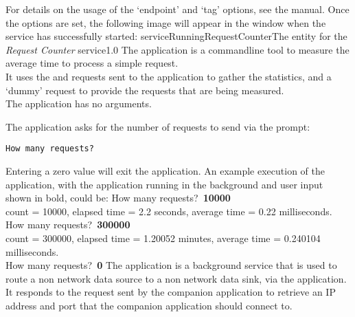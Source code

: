 For details on the usage of the `endpoint' and `tag' options, see the \emph{\CMU} manual.
Once the options are set, the following image will appear in the \emph{\CMU} window when
the service has successfully started:
%
{serviceRunningRequestCounter}{The \emph{\CMU} entity for the \emph{Request Counter}
service}{1.0}
\condPage
{}
The  application is a command\longDash{}line tool to
measure the average time to process a simple request.\\

It uses the  and
 requests sent to the
 application to gather the statistics, and a
`dummy' request to provide the requests that are being measured.\\

The application has no arguments.
\insertShortClientParameters{}

The application asks for the number of requests to send via the prompt:
\outputBegin
\begin{verbatim}
How many requests?
\end{verbatim}
\outputEnd{}
Entering a zero value will exit the application.
An example execution of the application, with the 
application running in the background and user input shown in bold, could be:
\outputBegin{}
How many requests?\ \textbf{10000}\\
count = 10000, elapsed time = 2.2 seconds, average time = 0.22 milliseconds.\\
How many requests?\ \textbf{300000}\\
count = 300000, elapsed time = 1.20052 minutes, average time = 0.240104 milliseconds.\\
How many requests?\ \textbf{0}
\outputEnd
{}
\condPage
{}
The  application is a background service that is used to
route a non\longDash\yarp{} network data source to a non\longDash\yarp{} network data
sink, via the  application.\\

It responds to the  request sent by the
companion application  to retrieve an IP address and port
that the companion application should connect to.\\

